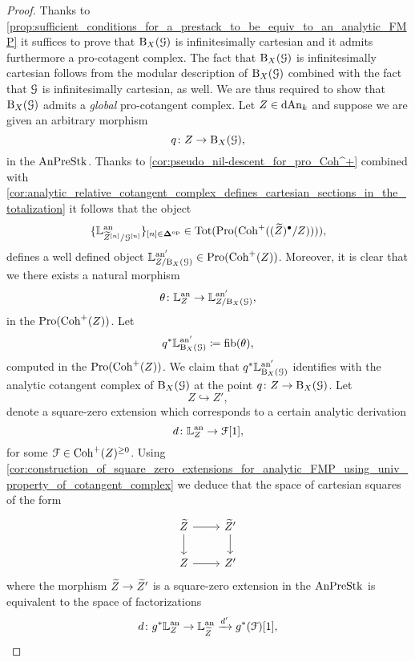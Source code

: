 \documentclass[10pt,a4paper,reqno]{amsart} %
\theoremstyle{plain}
\theoremstyle{definition}
\theoremstyle{remark}
\numberwithin{equation}{section}
\begin{document}
\begin{proof}
    Thanks to \cref{prop:sufficient_conditions_for_a_prestack_to_be_equiv_to_an_analytic_FMP} it suffices to prove that $\mathrm B_X(\mathcal G)$ is
    infinitesimally cartesian and it admits furthermore a pro-cotagent complex. The fact that $\mathrm B_X(\mathcal G)$ is infinitesimally cartesian follows from the
    modular description
    of $\mathrm B_X(\mathcal G)$ combined with the fact that $\mathcal G$ is infinitesimally cartesian, as well. We are thus required to show that $\mathrm B_X(\mathcal G)$ admits
    a \emph{global} pro-cotangent complex. Let $Z \in \mathrm{dAn}_k$ and suppose we are given an arbitrary morphism
        \[
            q \colon Z \to \mathrm B_X(\mathcal G),    
        \]
    in the \infcat $\mathrm{AnPreStk}$.
    Thanks to \cref{cor:pseudo_nil-descent_for_pro_Coh^+} combined with \cref{cor:analytic_relative_cotangent_complex_defines_cartesian_sections_in_the_totalization}
    it follows that the object
        \[
            \{ \mathbb L^\mathrm{an}_{\widetilde Z^{[n]} / \mathcal G^{[n]}} \}_{[n] \in \bm{\Delta} ^\mathrm{op}} \in \mathrm{Tot}(\mathrm{Pro}(\mathrm{Coh}^+((\widetilde Z)^\bullet / Z)))), 
        \]
    defines a well defined object $ \mathbb L^{\mathrm{an} ' }_{Z/ \mathrm B_X(\mathcal G)} \in \mathrm{Pro}(\mathrm{Coh}^+(Z))$. Moreover, it is clear that we there exists a natural morphism
        \[
            \theta \colon \mathbb L^\mathrm{an}_Z \to \mathbb L^{\mathrm{an} '}_{Z /  \mathrm B_X(\mathcal G)},
        \]
    in the \infcat $\mathrm{Pro}(\mathrm{Coh}^+(Z))$. Let
        \[
            q^* \mathbb L^{\mathrm{an} '}_{\mathrm B_X(\mathcal G)}  \coloneqq \mathrm{fib}(\theta),
        \]
    computed in the \infcat $\mathrm{Pro}(\mathrm{Coh}^+(Z))$. We claim that $q^* \mathbb L^{\mathrm{an} '}_{\mathrm B_X(\mathcal G)}$ identifies with the analytic cotangent
    complex of $\mathrm B_X(\mathcal G)$ at the point $q \colon Z \to \mathrm B_X(\mathcal G)$. Let
        \[
            Z \hookrightarrow Z',  
        \]
    denote a square-zero extension which corresponds to a certain analytic derivation
        \[
            d \colon \mathbb L^\mathrm{an}_Z \to \mathcal F[1],  
        \]
    for some $\mathcal F \in \mathrm{Coh}^+(Z)^{\ge 0}$. Using \cref{cor:construction_of_square_zero_extensions_for_analytic_FMP_using_univ_property_of_cotangent_complex}
    we deduce that the space of cartesian squares of the form 
        \[
        \begin{tikzcd}
            \tZ \ar{r} \ar{d} & \tZ' \ar{d} \\
            Z \ar{r} & Z'
        \end{tikzcd}
        \]
    where the morphism $\widetilde Z \to \widetilde Z'$ is a square-zero extension in the \infcat $\mathrm{AnPreStk}$ is equivalent to the space of factorizations
        \[
            d \colon g^*  \mathbb L^\mathrm{an}_Z \to \mathbb L^\mathrm{an}_{\widetilde Z} \xrightarrow{{d'}} g^*(\mathcal F)[1],
\]
\end{proof}
\end{document}
